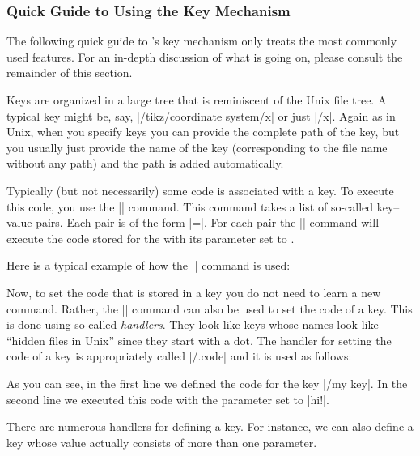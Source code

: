 \subsubsection{Quick Guide to Using the Key Mechanism}

The following quick guide to \pgfname's key mechanism only treats the most
commonly used features. For an in-depth discussion of what is going on, please
consult the remainder of this section.

Keys are organized in a large tree that is reminiscent of the Unix file tree. A
typical key might be, say, |/tikz/coordinate system/x| or just |/x|. Again as
in Unix, when you specify keys you can provide the complete path of the key,
but you usually just provide the name of the key (corresponding to the file
name without any path) and the path is added automatically.

Typically (but not necessarily) some code is associated with a key. To execute
this code, you use the |\pgfkeys| command. This command takes a list of
so-called key--value pairs. Each pair is of the form |=|.
For each pair the |\pgfkeys| command will execute the code stored for the
 with its parameter set to .

Here is a typical example of how the |\pgfkeys| command is used:
%
\begin{codeexample}
\end{codeexample}

Now, to set the code that is stored in a key you do not need to learn a new
command. Rather, the |\pgfkeys| command can also be used to set the code of a
key. This is done using so-called \emph{handlers}. They look like keys whose
names look like ``hidden files in Unix'' since they start with a dot. The
handler for setting the code of a key is appropriately called |/.code| and it
is used as follows:
%
\begin{codeexample}[]
\end{codeexample}
%
As you can see, in the first line we defined the code for the key |/my key|. In
the second line we executed this code with the parameter set to |hi!|.

There are numerous handlers for defining a key. For instance, we can also
define a key whose value actually consists of more than one parameter.
%
\begin{codeexample}[]
\end{codeexample}

